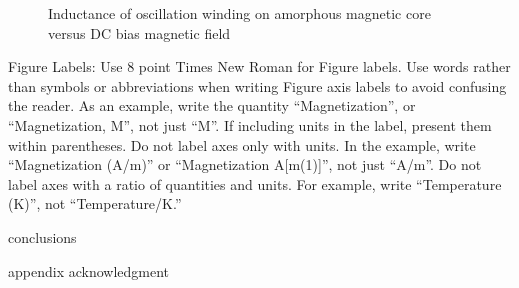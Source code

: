 \documentclass[letterpaper, 10 pt, conference]{ieeeconf}  %
\begin{document}
\begin{figure}[thpb]
  \centering
  \caption{Inductance of oscillation winding on amorphous
    magnetic core versus DC bias magnetic field}
  \label{figurelabel}
\end{figure}


Figure Labels: Use 8 point Times New Roman for Figure labels. Use words rather than symbols or abbreviations when writing Figure axis labels to avoid confusing the reader. As an example, write the quantity ``Magnetization'', or ``Magnetization, M'', not just ``M''. If including units in the label, present them within parentheses. Do not label axes only with units. In the example, write ``Magnetization (A/m)'' or ``Magnetization {A[m(1)]}'', not just ``A/m''. Do not label axes with a ratio of quantities and units. For example, write ``Temperature (K)'', not ``Temperature/K.'' \cite{imt_software_wiki}

{conclusions}

\addtolength{\textheight}{-12cm}   %


{appendix}
{acknowledgment}



\end{document}
